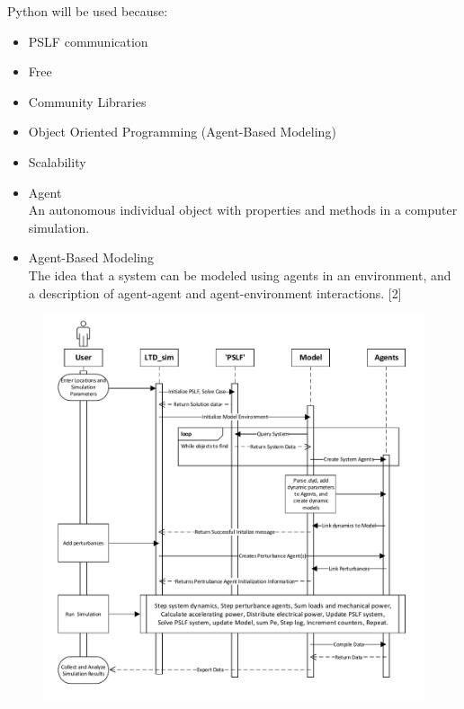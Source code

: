 \documentclass[14pt, unknownkeysallowed]{beamer}
\begin{document}
\begin{frame}
Python will be used because:
\begin{itemize}
	\item PSLF communication
	\item Free
	\item Community Libraries
	\item Object Oriented Programming (Agent-Based Modeling)
	\item Scalability
\end{itemize}
\end{frame}
\begin{frame}
\begin{itemize}
	\item Agent\\ An autonomous individual object with properties and methods in a computer simulation.
	\item Agent-Based Modeling\\ The idea that a system can be modeled using agents in an environment, and a description of agent-agent and agent-environment interactions. \tiny[2]
\end{itemize}
\end{frame}
\begin{frame}
\vspace{-.75em}
\begin{figure}
	\includegraphics[height=1.07\textheight]{systemInit01.pdf}
\end{figure}
\end{frame}
\end{document}
